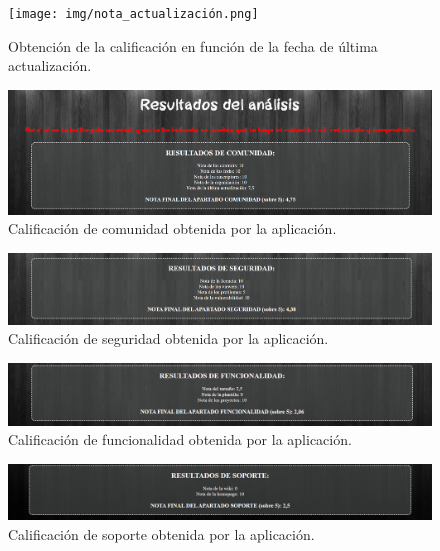 \documentclass[a4paper, 12pt]{book}
\begin{document}
\begin{figure}
    \centering
    \texttt{[image: img/nota\_actualización.png]}
    \caption{Obtención de la calificación en función de la fecha de última actualización.}\label{fig:nota_actualización}
\end{figure}
\begin{figure}
    \centering
    \includegraphics[width=1\textwidth, keepaspectratio]{img/test_comunidad.png}
    \caption{Calificación de comunidad obtenida por la aplicación.}\label{fig:test_comunidad}
\end{figure}
\begin{figure}
    \centering
    \includegraphics[width=1\textwidth, keepaspectratio]{img/test_seguridad.png}
    \caption{Calificación de seguridad obtenida por la aplicación.}\label{fig:test_seguridad}
\end{figure}
\begin{figure}
    \centering
    \includegraphics[width=1\textwidth, keepaspectratio]{img/test_funcionalidad.png}
    \caption{Calificación de funcionalidad obtenida por la aplicación.}\label{fig:test_funcionalidad}
\end{figure}
\begin{figure}
    \centering
    \includegraphics[width=1\textwidth, keepaspectratio]{img/test_soporte.png}
    \caption{Calificación de soporte obtenida por la aplicación.}\label{fig:test_soporte}
\end{figure}
\end{document}

